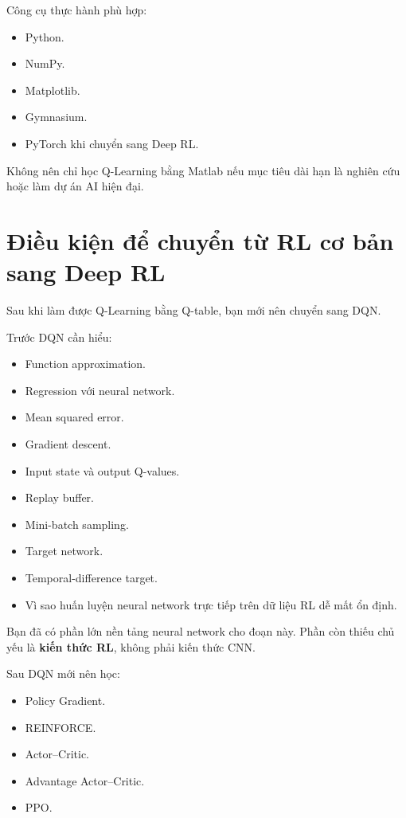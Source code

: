 \documentclass[12pt,a4paper]{article}
\begin{document}
Công cụ thực hành phù hợp:

\begin{itemize}[leftmargin=1.5em]
    \item Python.
    \item NumPy.
    \item Matplotlib.
    \item Gymnasium.
    \item PyTorch khi chuyển sang Deep RL.
\end{itemize}

Không nên chỉ học Q-Learning bằng Matlab nếu mục tiêu dài hạn là nghiên cứu hoặc làm dự án AI hiện đại.

\section{Điều kiện để chuyển từ RL cơ bản sang Deep RL}

Sau khi làm được Q-Learning bằng Q-table, bạn mới nên chuyển sang DQN.

Trước DQN cần hiểu:

\begin{itemize}[leftmargin=1.5em]
    \item Function approximation.
    \item Regression với neural network.
    \item Mean squared error.
    \item Gradient descent.
    \item Input state và output Q-values.
    \item Replay buffer.
    \item Mini-batch sampling.
    \item Target network.
    \item Temporal-difference target.
    \item Vì sao huấn luyện neural network trực tiếp trên dữ liệu RL dễ mất ổn định.
\end{itemize}

Bạn đã có phần lớn nền tảng neural network cho đoạn này. Phần còn thiếu chủ yếu là \textbf{kiến thức RL}, không phải kiến thức CNN.

Sau DQN mới nên học:

\begin{itemize}[leftmargin=1.5em]
    \item Policy Gradient.
    \item REINFORCE.
    \item Actor--Critic.
    \item Advantage Actor--Critic.
    \item PPO.
\end{itemize}
\end{document}
